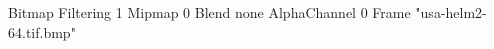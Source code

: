 {Bitmap
	{Filtering 1}
	{Mipmap 0}
	{Blend none}
	{AlphaChannel 0}
	{Frame "usa-helm2-64.tif.bmp"}
}

